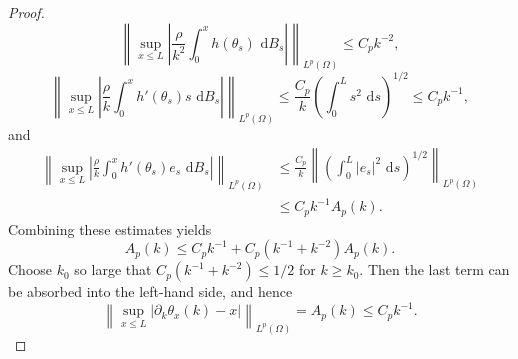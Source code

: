 \documentclass[10pt,a4paper]{amsart}
\newcommand{\dd}{\,\mathrm d}
\begin{document}
\begin{proof}
\[
    \left\|\sup_{x\le L}\left|\frac{\rho}{k^2}\int_0^x h(\theta_s)\,\dd B_s\right|\right\|_{L^p(\Omega)}
    \le C_p k^{-2},
\]
\[
    \left\|\sup_{x\le L}\left|\frac{\rho}{k}\int_0^x h'(\theta_s)s\,\dd B_s\right|\right\|_{L^p(\Omega)}
    \le \frac{C_p}{k}\left(\int_0^L s^2\,\dd s\right)^{1/2}
    \le C_p k^{-1},
\]
and
\[
\begin{aligned}
    \left\|\sup_{x\le L}\left|\frac{\rho}{k}\int_0^x h'(\theta_s)e_s\,\dd B_s\right|\right\|_{L^p(\Omega)}
    &\le \frac{C_p}{k}
      \left\|\left(\int_0^L |e_s|^2\,\dd s\right)^{1/2}\right\|_{L^p(\Omega)}  \\
    &\le C_p k^{-1}A_p(k).
\end{aligned}
\]
Combining these estimates yields
\[
    A_p(k)\le C_p k^{-1}+C_p(k^{-1}+k^{-2})A_p(k).
\]
Choose $k_0$ so large that $C_p(k^{-1}+k^{-2})\le1/2$ for $k\ge k_0$. Then the last term can be absorbed into the left-hand side, and hence
\begin{equation}\label{eq:e-fixed-bound}
    \left\|\sup_{x\le L}|\partial_k\theta_x(k)-x|\right\|_{L^p(\Omega)}
    =A_p(k)
    \le C_p k^{-1}.
\end{equation}


\end{proof}
\end{document}
